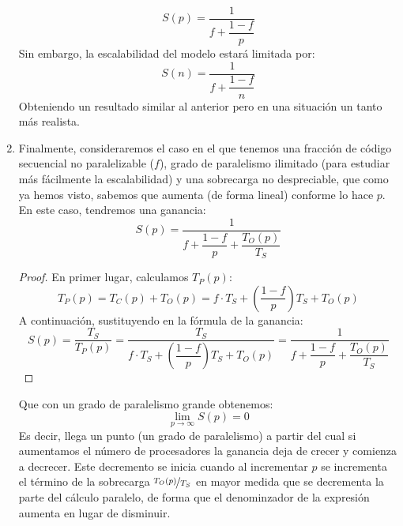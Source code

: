 \begin{enumerate}
        \begin{equation*}
            S(p) = \dfrac{1}{f+\dfrac{1-f}{p}}
        \end{equation*}
        Sin embargo, la escalabilidad del modelo estará limitada por:
        \begin{equation*}
            S(n) = \dfrac{1}{f+\dfrac{1-f}{n}}
        \end{equation*}
        Obteniendo un resultado similar al anterior pero en una situación un tanto más realista.
    \item Finalmente, consideraremos el caso en el que tenemos una fracción de código secuencial no paralelizable ($f$), grado de paralelismo ilimitado (para estudiar más fácilmente la escalabilidad) y una sobrecarga no despreciable, que como ya hemos visto, sabemos que aumenta (de forma lineal) conforme lo hace $p$. En este caso, tendremos una ganancia:
        \begin{equation*}
            S(p) = \dfrac{1}{f+\dfrac{1-f}{p}+\dfrac{T_O(p)}{T_S}}
        \end{equation*}
        \begin{proof}
            En primer lugar, calculamos $T_P(p)$:
            \begin{equation*}
                T_P(p) = T_C(p) + T_O(p) = f\cdot T_S + \left(\dfrac{1-f}{p}\right)T_S + T_O(p)
            \end{equation*}
            A continuación, sustituyendo en la fórmula de la ganancia:
            \begin{equation*}
                S(p) = \dfrac{T_S}{T_P(p)} = \dfrac{T_S}{f\cdot T_S + \left(\dfrac{1-f}{p}\right)T_S + T_O(p)} = \dfrac{1}{f+\dfrac{1-f}{p} + \dfrac{T_O(p)}{T_S}}
            \end{equation*}
        \end{proof}
        
        Que con un grado de paralelismo grande obtenemos:
        \begin{equation*}
            \lim_{p\to\infty}S(p) = 0
        \end{equation*}
        Es decir, llega un punto (un grado de paralelismo) a partir del cual si aumentamos el número de procesadores la ganancia deja de crecer y comienza a decrecer. Este decremento se inicia cuando al incrementar $p$ se incrementa el término de la sobrecarga $\nicefrac{T_O(p)}{T_S}$ en mayor medida que se decrementa la parte del cálculo paralelo, de forma que el denominzador de la expresión aumenta en lugar de disminuir.
\end{enumerate}

